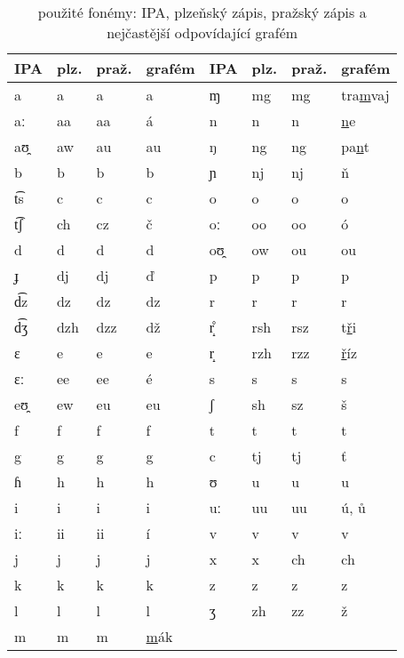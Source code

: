 \begin{table}[htpb]
\begin{center}
\begin{tabular}{|l|l|l|l||l|l|l|l|}
\hline
IPA & plz. & praž. & grafém & IPA & plz. & praž. & grafém \\
\hline
a  & a   & a   & a      &     ɱ  & mg  & mg  & tra\underline{m}vaj \\
aː & aa  & aa  & á      &     n  & n   & n   & \underline{n}e \\
aʊ̯ & aw  & au  & au     &     ŋ  & ng  & ng  & pa\underline{n}t \\
b  & b   & b   & b      &     ɲ  & nj  & nj  & \v{n} \\
t͡s & c   & c   & c      &     o  & o   & o   & o \\
t͡ʃ & ch  & cz  & č      &     oː & oo  & oo  & ó \\
d  & d   & d   & d      &     oʊ̯ & ow  & ou  & ou \\
ɟ  & dj  & dj  & \v{d}  &     p  & p   & p   & p \\
d͡z & dz  & dz  & dz     &     r  & r   & r   & r \\
d͡ʒ & dzh & dzz & dž     &     r̝̊  & rsh & rsz & t\underline{\v{r}}i \\
ɛ  & e   & e   & e      &     r̝  & rzh & rzz & \underline{\v{r}}íz \\
ɛː & ee  & ee  & é      &     s  & s   & s   & s \\
eʊ̯ & ew  & eu  & eu     &     ʃ  & sh  & sz  & š \\
f  & f   & f   & f      &     t  & t   & t   & t \\
g  & g   & g   & g      &     c  & tj  & tj  & \v{t} \\
ɦ  & h   & h   & h      &     ʊ  & u   & u   & u \\
i  & i   & i   & i      &     uː & uu  & uu  & ú, \r{u} \\
iː & ii  & ii  & í      &     v  & v   & v   & v \\
j  & j   & j   & j      &     x  & x   & ch  & ch \\
k  & k   & k   & k      &     z  & z   & z   & z \\
l  & l   & l   & l      &     ʒ  & zh  & zz  & ž \\
m  & m   & m   & \underline{m}ák
                        &        &     &     & \\
\hline
\end{tabular}
\caption{použité fonémy: IPA, plzeňský zápis, pražský zápis a nejčastější
odpovídající grafém}\label{tab:phones}
\end{center}
\end{table}
\normalfont

